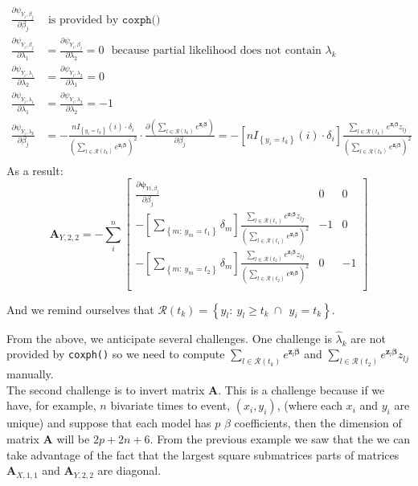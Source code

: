 \documentclass[]{article}
\begin{document}
$$
\begin{aligned}
  \frac{\partial \psi_{Y_i,\beta_j}}{ \partial \beta_j} &\text{~is provided by }\texttt{coxph()}\\
  \frac{\partial \psi_{Y_i,\beta_j}}{ \partial \lambda_1} &= \frac{\partial \psi_{Y_i,\beta_j}}{ \partial \lambda_2} = 0~~~\text{because partial likelihood does not contain } \lambda_k\\
  \frac{\partial \psi_{Y_i,\lambda_1}}{  \partial \lambda_2} &= \frac{\partial \psi_{Y_i,\lambda_2}}{  \partial \lambda_1} = 0\\
  \frac{\partial \psi_{Y_i,\lambda_1}}{  \partial \lambda_1} &= \frac{\partial \psi_{Y_i,\lambda_2}}{  \partial \lambda_2} = - 1\\
  \frac{\partial \psi_{Y_i,\lambda_k}}{  \partial \beta_j} &= -\frac{nI_{\left\{y_i=t_k   \right\}}(i)\cdot\delta_i}{\left(   \sum_{l\in \mathcal{R}(t_k)} e^{\pmb{z}_l\pmb{\beta}}  \right)^2} \cdot \frac{ \partial \left(   \sum_{l\in \mathcal{R}(t_k)} e^{\pmb{z}_l\pmb{\beta}}  \right)}{\partial  \beta_j} = -\left[  nI_{\left\{y_i=t_k   \right\}}(i)\cdot\delta_i  \right] \frac{     \sum_{l\in \mathcal{R}(t_k)}  e^{\pmb{z}_l\pmb{\beta}} z_{lj}  }{\left(   \sum_{l\in \mathcal{R}(t_k)} e^{\pmb{z}_l\pmb{\beta}}  \right)^2} \\
\end{aligned}
$$
As a result:
  \[
  \pmb{A}_{Y,2,2}
   =-\sum_i^n\begin{bmatrix}
      \frac{\partial \pmb{\psi}_{Yi,\beta_j}}{ \partial \beta_j} & 0 & 0 \\
      -\left[  \sum_{\left\{m:~y_m = t_1\right\}} \delta_m  \right] \frac{     \sum_{l\in \mathcal{R}(t_1)}  e^{\pmb{z}_l\pmb{\beta}} z_{lj}  }{\left(   \sum_{l\in \mathcal{R}(t_1)} e^{\pmb{z}_l\pmb{\beta}}  \right)^2} & -1 & 0 \\
      -\left[  \sum_{\left\{m:~y_m = t_2\right\}} \delta_m  \right] \frac{     \sum_{l\in \mathcal{R}(t_2)}  e^{\pmb{z}_l\pmb{\beta}} z_{lj}  }{\left(   \sum_{l\in \mathcal{R}(t_2)} e^{\pmb{z}_l\pmb{\beta}}  \right)^2} & 0 & -1 \\
  \end{bmatrix}
  \]

And we remind ourselves that $\mathcal{R}(t_k) = \left\{y_l: ~y_l \geq t_k ~\cap~ ~y_i=t_k\right\}$. 


From the above, we anticipate several challenges. One challenge is $\hat{\lambda}_k$ are not provided by \texttt{coxph()} so we need to compute $\sum_{l\in \mathcal{R}(t_k)} e^{\pmb{z}_l\pmb{\beta}}$ and $\sum_{l\in \mathcal{R}(t_2)}  e^{\pmb{z}_l\pmb{\beta}} z_{lj}$ manually.\\
The second challenge is to invert matrix $\pmb{A}$. This is a challenge because if we have, for example, $n$ bivariate times to event, $(x_i,y_i)$, (where each $x_i$ and $y_i$ are unique) and suppose that each model has $p$ $\beta$ coefficients, then the dimension of matrix $\pmb{A}$ will be $2p + 2n + 6$. From the previous example we saw that the we can take advantage of the fact that the  largest square submatrices parts of matrices $\pmb{A}_{X,1,1}$ and $\pmb{A}_{Y,2,2}$ are diagonal.
\end{document}
